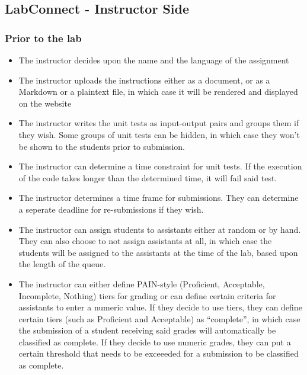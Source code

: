 \documentclass[a4paper, 12pt]{article}
\begin{document}
    \subsection{LabConnect - Instructor Side}
    
    \subsubsection{Prior to the lab}
    
    \begin{itemize}
        \item The instructor decides upon the name and the language of the assignment
        \item The instructor uploads the instructions either as a document, or as a Markdown
          or a plaintext file, in which case it will be rendered and displayed on the website
        \item The instructor writes the unit tests as input-output pairs and groups them if
          they wish. Some groups of unit tests can be hidden, in which case they won't be
          shown to the students prior to submission.
        \item The instructor can determine a time constraint for unit tests. If the execution
          of the code takes longer than the determined time, it will fail said test.
        \item The instructor determines a time frame for submissions. They can determine a
          seperate deadline for re-submissions if they wish.
        \item The instructor can assign students to assistants either at random or by hand.
          They can also choose to not assign assistants at all, in which case the students
          will be assigned to the assistants at the time of the lab, based upon the length
          of the queue.
        \item The instructor can either define PAIN-style (Proficient, Acceptable, Incomplete, Nothing)
          tiers for grading or can define certain criteria for assistants to enter a numeric value. If they
          decide to use tiers, they can define certain tiers (such as Proficient and Acceptable) as ``complete'',
          in which case the submission of a student receiving said grades will automatically be classified as complete.
          If they decide to use numeric grades, they can put a certain threshold that needs to be exceeeded for a
          submission to be classified as complete.
    \end{itemize}
    
\end{document}
